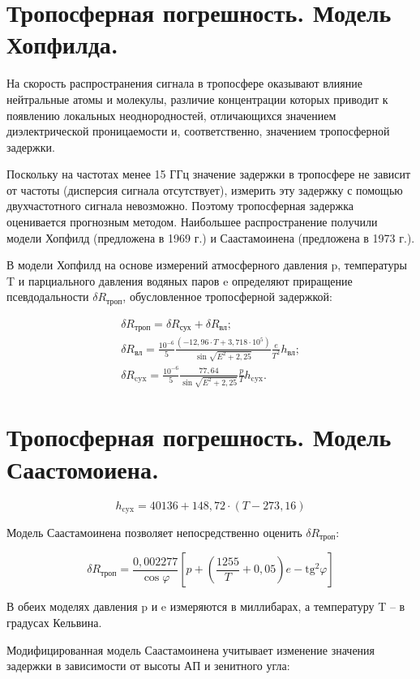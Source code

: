 \documentclass[14pt,a4paper,oneside]{extarticle}
\begin{document}
\section{Тропосферная погрешность. Модель Хопфилда.}

На скорость распространения сигнала в тропосфере оказывают влияние нейтральные атомы и молекулы, различие концентрации которых приводит к появлению локальных неоднородностей, отличающихся значением диэлектрической проницаемости и, соответственно, значением тропосферной задержки.

Поскольку на частотах менее 15 ГГц значение задержки в тропосфере не зависит от частоты (дисперсия сигнала отсутствует), измерить эту задержку с помощью двухчастотного сигнала невозможно. Поэтому тропосферная задержка оценивается прогнозным методом. Наибольшее распространение получили модели Хопфилд (предложена в 1969 г.) и Саастамоинена (предложена в 1973 г.).

В модели Хопфилд на основе измерений атмосферного давления p, температуры T и парциального давления водяных паров e определяют приращение псевдодальности $\delta R_{\text{троп}}$, обусловленное тропосферной задержкой:

\[\begin{gathered}
        \delta R_{\text{троп}}=\delta R_{\text{сух}}+\delta R_{\text{вл}}; \\
        {\delta}R_{\text{вл}}=\frac{10^{-6}}{5}\frac{(-12,96\cdot T+3,718\cdot10^{5})}{\sin\sqrt{E^{2}+2,25}}\frac{e}{T^{2}}h_{\text{вл}}; \\
        \delta R_{\text{cyx}}=\frac{10^{-6}}{5}\frac{77,64}{\sin\sqrt{E^{2}+2,25}}\frac{p}{T}h_{\text{cyx}}.
    \end{gathered}\]

\section{Тропосферная погрешность. Модель Саастомоиена.}

\[h_{\mathrm{cyx}}=40136+148,72\cdot(T-273,16)\]

Модель Саастамоинена позволяет непосредственно оценить $\delta R_{\text{троп}}$:

\[\delta R_{\text{троп}}=\frac{0,002277}{\cos\varphi}\left[p+\left(\frac{1255}{T}+0,05\right)e-\mathrm{tg}^{2}\varphi\right]\]

В обеих моделях давления p и e измеряются в миллибарах, а температуру T – в градусах Кельвина.

Модифицированная модель Саастамоинена учитывает изменение значения задержки в зависимости от высоты АП и зенитного угла:
\end{document}
